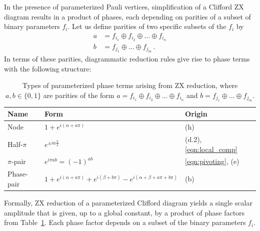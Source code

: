 \documentclass[
  a4paper,
  onecolumn,
  11pt,
  allowtoday
]{quantumarticle}
\begin{document}
In the presence of parameterized Pauli vertices, simplification of a Clifford ZX diagram results in a product of phases, each depending on parities of a subset of binary parameters $f_i$.
Let us define parities of two specific subsets of the $f_i$ by
\begin{align}
  a &= f_{i_1} \oplus f_{i_2} \oplus \ldots \oplus f_{i_n} \\
  b &= f_{j_1} \oplus \ldots \oplus f_{j_m}\,.
\end{align}
In terms of these parities, diagrammatic reduction rules give rise to phase terms with the following structure:
\begin{table}[H]
  \centering
  {
    \renewcommand{\arraystretch}{2}
    \begin{tabular}{>{\centering\arraybackslash}p{3cm} >{\centering\arraybackslash}p{5cm} >{\centering\arraybackslash}p{4cm}}
      \textbf{Name} &
      \textbf{Form} &
      \textbf{Origin} \\ \hline\hline

      Node &
      $1+e^{i\left(\alpha +a\pi\right)}$ &
      (h) \\ \hline

      Half-$\pi$ &
      $e^{\pm i a \frac{\pi}{2}}$&
      (d.2), \eqref{eqn:local_comp} \\ \hline


      $\pi$-pair &
      $e^{i\pi a b} = (-1)^{ab}$ &
      \eqref{eqn:pivoting}, (e) \\ \hline

      Phase-pair &
      $1+e^{i (\alpha + a\pi) } + e^{i(\beta + b\pi)} - e^{i (\alpha + \beta +a \pi+b\pi)}$ &
      (b)  \\ \hline
    \end{tabular}
  }
  \caption{Types of parameterized phase terms arising from ZX reduction, where $a, b \in \{0, 1\}$ are parities of the form $a = f_{i_1} \oplus f_{i_2} \oplus \ldots \oplus f_{i_n}$ and $b = f_{j_1} \oplus \ldots \oplus f_{j_m}$.}
  \label{tab:paramzx:subtermtypes}
\end{table}

Formally, ZX reduction of a parameterized Clifford diagram yields a single scalar amplitude that is given, up to a global constant, by a product of phase factors from Table~\ref{tab:paramzx:subtermtypes}. Each phase factor depends on a subset of the binary parameters $f_i$.
\end{document}
